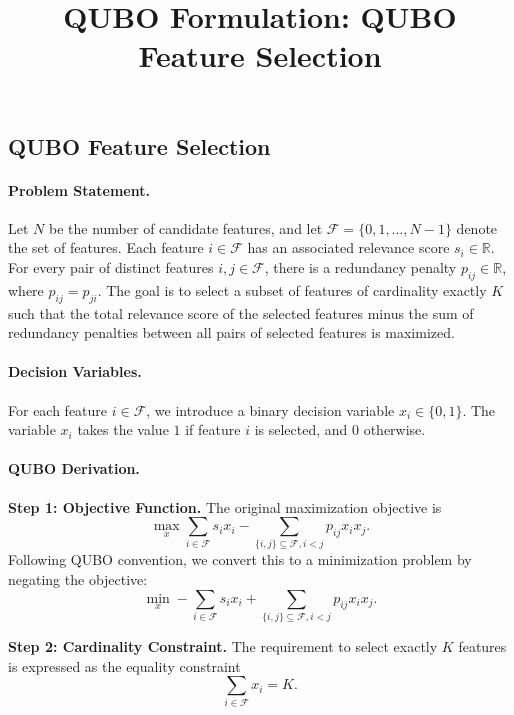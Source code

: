 \documentclass[12pt]{article}
\title{QUBO Formulation: QUBO Feature Selection}
\date{}
\begin{document}
\maketitle

\subsection*{QUBO Feature Selection}

\paragraph{Problem Statement.}
Let $N$ be the number of candidate features, and let $\mathcal{F} = \{0, 1, \dots, N-1\}$ denote the set of features. Each feature $i \in \mathcal{F}$ has an associated relevance score $s_i \in \mathbb{R}$. For every pair of distinct features $i, j \in \mathcal{F}$, there is a redundancy penalty $p_{ij} \in \mathbb{R}$, where $p_{ij} = p_{ji}$. The goal is to select a subset of features of cardinality exactly $K$ such that the total relevance score of the selected features minus the sum of redundancy penalties between all pairs of selected features is maximized.

\paragraph{Decision Variables.}
For each feature $i \in \mathcal{F}$, we introduce a binary decision variable $x_i \in \{0, 1\}$. The variable $x_i$ takes the value $1$ if feature $i$ is selected, and $0$ otherwise.

\paragraph{QUBO Derivation.}
\textbf{Step 1: Objective Function.}
The original maximization objective is
\begin{equation}
    \max_{x} \sum_{i \in \mathcal{F}} s_i x_i - \sum_{\{i,j\} \subseteq \mathcal{F}, i < j} p_{ij} x_i x_j.
\end{equation}
Following QUBO convention, we convert this to a minimization problem by negating the objective:
\begin{equation}
    \min_{x} -\sum_{i \in \mathcal{F}} s_i x_i + \sum_{\{i,j\} \subseteq \mathcal{F}, i < j} p_{ij} x_i x_j.
\end{equation}

\textbf{Step 2: Cardinality Constraint.}
The requirement to select exactly $K$ features is expressed as the equality constraint
\begin{equation}
    \sum_{i \in \mathcal{F}} x_i = K.
\end{equation}
\end{document}
